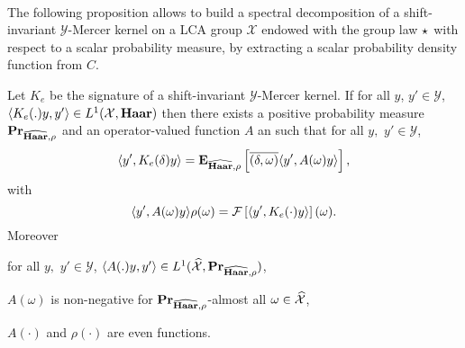\paragraph{}
The following proposition allows to build a spectral decomposition of a
shift-invariant $\mathcal{Y}$-Mercer kernel on a \acs{LCA} group $\mathcal{X}$
endowed with the group law $\star$ with respect to a scalar probability
measure, by extracting a scalar probability density function from $C$.
\begin{proposition}
\label{pr:spectral}
    Let $K_e$ be the signature of a shift-invariant $\mathcal{Y}$-Mercer
    kernel. If for all $y$, $y' \in\mathcal{Y}$, $\langle K_e(.)y,y'\rangle\in
    L^1(\mathcal{X},\mathbf{Haar})$ then there exists a positive probability measure
    ${\mathbf{{Pr}}}_{\widehat{\mathbf{Haar}},\rho}$ and an operator-valued function $A$ an
    such that for all $y,$ $y'\in\mathcal{Y}$,
    \begin{dmath}
        \label{eq:expectation_spec} \inner{y', K_e(\delta)y}
        =\expectation_{\dual{\Haar},\rho}\left[\conj{\pairing{\delta,
        \omega}}\inner{y', A(\omega)y}\right],
    \end{dmath}
    with
    \begin{dmath}
        \label{eq:comega} \inner{y', A(\omega)y}\rho(\omega) = \FT{\inner{y',
        K_e(\cdot)y}}(\omega).
    \end{dmath}
    Moreover
    \begin{propenum}
        \item for all $y,$ $y'\in\mathcal{Y}$, $\langle A(.)y,y'\rangle\in
        L^1(\widehat{\mathcal{X}}, {\mathbf{{Pr}}}_{\widehat{\mathbf{Haar}},\rho})$,
        \item $A(\omega)$ is non-negative for
        ${\mathbf{{Pr}}}_{\widehat{\mathbf{Haar}},\rho}$-almost all
        $\omega\in\widehat{\mathcal{X}}$,
        \item $A(\cdot)$ and $\rho(\cdot)$ are even functions.
    \end{propenum}
\end{proposition}
